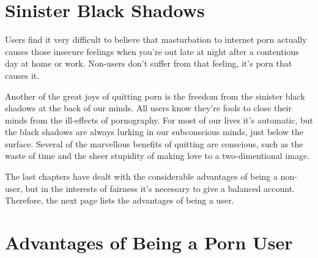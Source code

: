 \documentclass[easypeasy.tex]{subfiles}
\begin{document}
\section{Sinister Black Shadows}

Users find it very difficult to believe that masturbation to internet porn actually causes those insecure feelings when you're out late at night after a contentious day at home or work. Non-users don't suffer from that feeling, it's porn that causes it.

Another of the great joys of quitting porn is the freedom from the sinister black shadows at the back of our minds. All users know they're fools to close their minds from the ill-effects of pornography. For most of our lives it's automatic, but the black shadows are always lurking in our subconscious minds, just below the surface. Several of the marvellous benefits of quitting are conscious, such as the waste of time and the sheer stupidity of making love to a two-dimentional image. 

The last chapters have dealt with the considerable advantages of being a non-user, but in the interests of fairness it's necessary to give a balanced account. Therefore, the next page lists the advantages of being a user.

\newpage
\section{Advantages of Being a Porn User}
\end{document}
